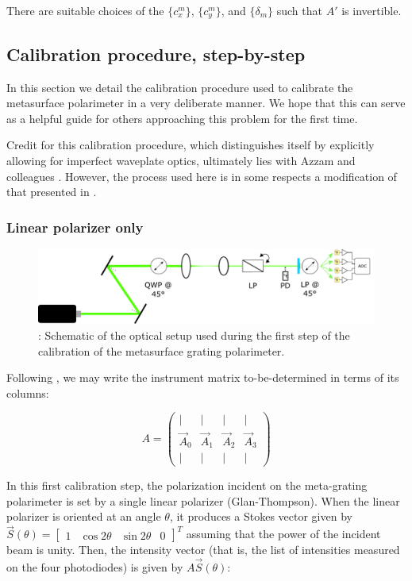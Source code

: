 \documentclass[footinbib,aps,prl,superscriptaddress]{revtex4-1}
\begin{document}
There are suitable choices of the $\{c_x^m\}$, $\{c_y^m\}$, and $\{\delta_m\}$ such that $A'$ is invertible.


\subsection{Calibration procedure, step-by-step}

In this section we detail the calibration procedure used to calibrate the metasurface polarimeter in a very deliberate manner. We hope that this can serve as a helpful guide for others approaching this problem for the first time.

Credit for this calibration procedure, which distinguishes itself by explicitly allowing for imperfect waveplate optics, ultimately lies with Azzam and colleagues \citep{Azzam1989}. However, the process used here is in some respects a modification of that presented in \cite{Azzam1989}.

\subsubsection{Linear polarizer only}

\begin{figure}[!htp]
	\centering
	\includegraphics[width=\linewidth]{schematic_I.pdf}
	\caption{\label{fig:schematic_I}: Schematic of the optical setup used during the first step of the calibration of the metasurface grating polarimeter.}
\end{figure}

Following \citep{Azzam1989}, we may write the instrument matrix to-be-determined in terms of its columns:

\begin{equation}
A = \begin{pmatrix}
| & | & | & | \\
\vec{A}_0 & \vec{A}_1 & \vec{A}_2 & \vec{A}_3 \\
| & | & | & |
\end{pmatrix}
\end{equation}

In this first calibration step, the polarization incident on the meta-grating polarimeter is set by a single linear polarizer (Glan-Thompson). When the linear polarizer is oriented at an angle $\theta$, it produces a Stokes vector given by $\vec{S}(\theta) = \begin{bmatrix} 1 & \cos2\theta & \sin2\theta & 0 \end{bmatrix}^T$ assuming that the power of the incident beam is unity. Then, the intensity vector (that is, the list of intensities measured on the four photodiodes) is given by $A\vec{S}(\theta)$:
\end{document}
